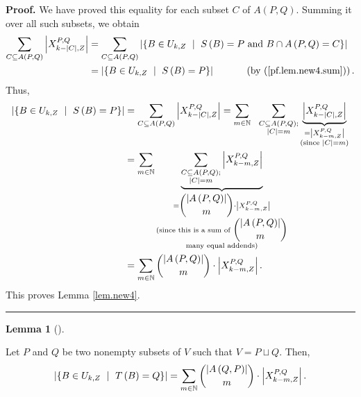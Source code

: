 \documentclass[numbers=enddot,12pt,final,onecolumn,notitlepage]{scrartcl}%
\theoremstyle{definition}
\newtheorem{lem}[theo]{Lemma}
\newenvironment{lemma}[1][]
{\begin{lem}[#1]\begin{leftbar}}
{\end{leftbar}\end{lem}}
\newenvironment{proof}[1][Proof]{\noindent\textbf{#1.} }{\ \rule{0.5em}{0.5em}}
\let\sumnonlimits\sum
\renewcommand{\sum}{\sumnonlimits\limits}
\theoremstyle{plainsl}
\begin{document}
\begin{proof}
We have proved this equality for each subset $C$ of $A\left(  P,Q\right)  $.
Summing it over all such subsets, we obtain%
\begin{align*}
\sum_{C\subseteq A\left(  P,Q\right)  }\left\vert X_{k-\left\vert C\right\vert
,Z}^{P,Q}\right\vert  &  =\sum_{C\subseteq A\left(  P,Q\right)  }\left\vert
\left\{  B\in U_{k,Z}\ \mid\ S\left(  B\right)  =P\text{ and }B\cap A\left(
P,Q\right)  =C\right\}  \right\vert \\
&  =\left\vert \left\{  B\in U_{k,Z}\ \mid\ S\left(  B\right)  =P\right\}
\right\vert \ \ \ \ \ \ \ \ \ \ \left(  \text{by (\ref{pf.lem.new4.sum}%
)}\right)  .
\end{align*}
Thus,%
\begin{align*}
\left\vert \left\{  B\in U_{k,Z}\ \mid\ S\left(  B\right)  =P\right\}
\right\vert  &  =\sum_{C\subseteq A\left(  P,Q\right)  }\left\vert
X_{k-\left\vert C\right\vert ,Z}^{P,Q}\right\vert =\sum_{m\in\mathbb{N}%
}\ \ \sum_{\substack{C\subseteq A\left(  P,Q\right)  ;\\\left\vert
C\right\vert =m}}\underbrace{\left\vert X_{k-\left\vert C\right\vert ,Z}%
^{P,Q}\right\vert }_{\substack{=\left\vert X_{k-m,Z}^{P,Q}\right\vert
\\\text{(since }\left\vert C\right\vert =m\text{)}}}\\
&  =\sum_{m\in\mathbb{N}}\underbrace{\sum_{\substack{C\subseteq A\left(
P,Q\right)  ;\\\left\vert C\right\vert =m}}\left\vert X_{k-m,Z}^{P,Q}%
\right\vert }_{\substack{=\dbinom{\left\vert A\left(  P,Q\right)  \right\vert
}{m}\cdot\left\vert X_{k-m,Z}^{P,Q}\right\vert \\\text{(since this is a sum of
}\dbinom{\left\vert A\left(  P,Q\right)  \right\vert }{m}\\\text{many equal
addends)}}}\\
&  =\sum_{m\in\mathbb{N}}\dbinom{\left\vert A\left(  P,Q\right)  \right\vert
}{m}\cdot\left\vert X_{k-m,Z}^{P,Q}\right\vert .
\end{align*}
This proves Lemma \ref{lem.new4}.
\end{proof}

\begin{lemma}
\label{lem.new5} Let $P$ and $Q$ be two nonempty subsets of $V$ such that
$V=P\sqcup Q$. Then,%
\[
\left\vert \left\{  B\in U_{k,Z}\ \mid\ T\left(  B\right)  =Q\right\}
\right\vert =\sum_{m\in\mathbb{N}}\dbinom{\left\vert A\left(  Q,P\right)
\right\vert }{m}\cdot\left\vert X_{k-m,Z}^{P,Q}\right\vert .
\]

\end{lemma}
\end{document}
